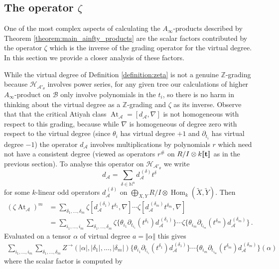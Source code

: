 \documentclass[english,letter paper,12pt,leqno]{article}
\theoremstyle{example}
\numberwithin{equation}{section}
\def\AA{\mathcal{A}}
\def\BB{\mathcal{B}}
\def\HH{\HH}
\def\HH{\mathcal{H}}
\def\Hom{\operatorname{Hom}}
\def\nZ{\mathds{Z}}
\DeclareMathOperator{\vAt}{At}
\begin{document}
\subsection{The operator $\zeta$}\label{section:propagator}

One of the most complex aspects of calculating the $A_\infty$-products described by Theorem \ref{theorem:main_ainfty_products} are the scalar factors contributed by the operator $\zeta$ which is the inverse of the grading operator for the virtual degree. In this section we provide a closer analysis of these factors.

While the virtual degree of Definition \ref{definition:zeta} is not a genuine $\nZ$-grading because $\HH_{\AA'_\theta}$ involves power series, for any given tree our calculations of higher $A_\infty$-product on $\BB$ only involve polynomials in the $t_i$, so there is no harm in thinking about the virtual degree as a $\nZ$-grading and $\zeta$ as its inverse. Observe that that the critical Atiyah class $\vAt_{\AA} = [ d_{\AA}, \nabla ]$ is not homogeneous with respect to this grading, because while $\nabla$ is homogeneous of degree zero with respect to the virtual degree (since $\theta_i$ has virtual degree $+1$ and $\partial_{t_i}$ has virtual degree $-1$) the operator $d_{\AA}$ involves multiplications by polynomials $r$ which need not have a consistent degree (viewed as operators $r^{\#}$ on $R/I \otimes k\llbracket \bold{t} \rrbracket$ as in the previous section). To analyse this operator on $\HH_{\AA'_\theta}$ we write
\[
d_{\AA} = \sum_{\delta \in \mathbb{N}^n} d_{\AA}^{\,(\delta)} t^\delta
\]
for some $k$-linear odd operators $d_{\AA}^{\,(\delta)}$ on $\bigoplus_{X,Y} R/I \otimes \Hom_k(\widetilde{X},\widetilde{Y})$. Then
\begin{align*}
(\zeta \vAt_{\AA})^m &= \sum_{\delta_1,\ldots,\delta_m} \zeta [ d^{\,(\delta_1)}_{\AA} t^{\delta_1}, \nabla ] \cdots \zeta [ d^{\,(\delta_m)}_{\AA} t^{\delta_m}, \nabla ]\\
 &= \sum_{i_1,\ldots,i_m} \sum_{\delta_1,\ldots,\delta_m} \zeta \Big\{ \theta_{i_1} \partial_{t_{i_1}}(t^{\delta_1}) d_{\AA}^{\,(\delta_1)} \Big\} \cdots \zeta \Big\{ \theta_{i_m} \partial_{t_{i_m}}(t^{\delta_m}) d_{\AA}^{\,(\delta_m)} \Big\}\,.
\end{align*}
Evaluated on a tensor $\alpha$ of virtual degree $a = \Vert \alpha \Vert$ this gives
\begin{align*}
\sum_{i_1, \ldots, i_m} \sum_{\delta_1,\ldots,\delta_m} Z^{\,\rightarrow}(|\alpha|,|\delta_1|,\ldots,|\delta_m|) \Big\{ \theta_{i_1} \partial_{t_{i_1}}(t^{\delta_1}) d_{\AA}^{\,(\delta_1)} \Big\} \cdots \Big\{ \theta_{i_m} \partial_{t_{i_m}}(t^{\delta_m}) d_{\AA}^{\,(\delta_m)} \Big\}(\alpha)
\end{align*}
where the scalar factor is computed by
\end{document}
